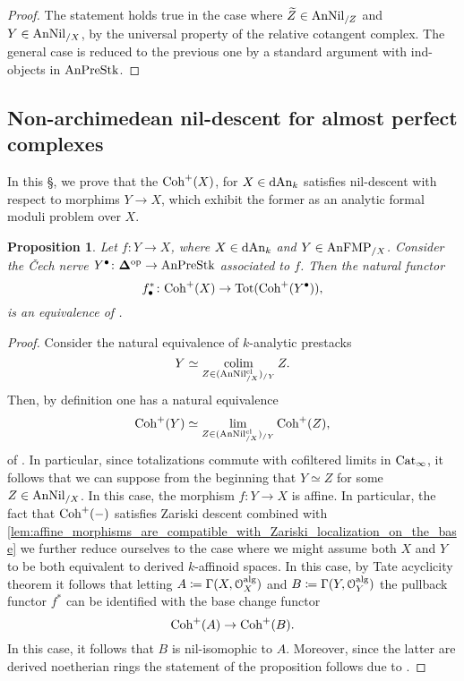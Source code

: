 \documentclass[10pt,a4paper,reqno]{amsart} %
\theoremstyle{plain}
\newtheorem{prop}[thm]{Proposition}
\theoremstyle{definition}
\theoremstyle{remark}
\numberwithin{equation}{section}
\begin{document}
\begin{proof}
    The statement holds true in the case where $\widetilde Z \in \mathrm{AnNil}_{/Z}$ and $Y \in \mathrm{AnNil}_{/X}$, by the universal property of the relative cotangent complex.
    The general case is reduced to the previous one by a standard argument with ind-objects in $\mathrm{AnPreStk}$.
\end{proof}


\subsection{Non-archimedean nil-descent for almost perfect complexes}
In this \S, we prove that the \infcat $\mathrm{Coh}^+(X)$, for $X \in \mathrm{dAn}_k$ satisfies nil-descent with respect to morphims $Y \to X$, which exhibit
the former as an analytic formal moduli problem over $X$.

\begin{prop} \label{prop:nil_descent_for_Coh^+}
    Let $f \colon Y \to X$, where $X \in \mathrm{dAn}_k$ and $Y \in \mathrm{AnFMP}_{/X}$. Consider the \v{C}ech nerve
    $Y^\bullet \colon \mathbf \Delta ^\mathrm{op} \to \mathrm{AnPreStk}$ associated to $f$.
    Then the natural functor
        \[
            f_\bullet^* \colon \mathrm{Coh}^+(X) \to \mathrm{Tot}(\mathrm{Coh}^+(Y^\bullet)),  
        \]
    is an equivalence of \infcats.
\end{prop}

\begin{proof}
    Consider the natural equivalence of $k$-analytic prestacks
        \[
            Y \simeq \operatorname*{colim}_{Z \in (\mathrm{AnNil}^{\mathrm{cl}}_{/X})_{/Y}}  Z.
        \]
    Then, by definition one has a natural equivalence
        \[
            \mathrm{Coh}^+(Y) \simeq \lim_{Z \in (\mathrm{AnNil}^{\mathrm{cl}}_{/X})_{/Y}} \mathrm{Coh}^+(Z),  
        \]
    of \infcats. In particular, since totalizations commute with cofiltered limits in $\mathrm{Cat}_\infty$, it follows that we can suppose from
    the beginning that $Y \simeq Z$ for some $Z \in \mathrm{AnNil}_{/X}$. In this case, the morphism $f \colon Y \to X$ is affine. In particular, the fact that
    $\mathrm{Coh}^+(-)$ satisfies Zariski descent combined with \cref{lem:affine_morphisms_are_compatible_with_Zariski_localization_on_the_base} we further reduce ourselves
    to the case where we might assume both $X$ and $Y$ to be both equivalent to derived $k$-affinoid spaces. In this case, by Tate acyclicity
    theorem it follows that letting $A \coloneqq \Gamma(X, \mathcal O_X ^\mathrm{alg})$ and $B \coloneqq \Gamma(Y, \mathcal O_Y^\mathrm{alg})$ the pullback functor $f^*$ can be identified with
    the base change functor
        \[
            \mathrm{Coh}^+(A) \to \mathrm{Coh}^+(B).  
        \]
    In this case, it follows that $B$ is nil-isomophic to $A$. Moreover, since the latter are derived noetherian rings
    the statement of the proposition follows due to \cite[Theorem 3.3.1]{preygel_Leistner_Mapping_stacks_properness}.
\end{proof}
\end{document}
